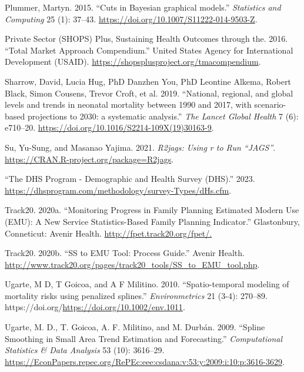 \begin{CSLReferences}{1}{0}
\leavevmode{}%
Plummer, Martyn. 2015. {``{Cuts in Bayesian graphical models}.''} \emph{Statistics and Computing} 25 (1): 37--43. \url{https://doi.org/10.1007/S11222-014-9503-Z}.

\leavevmode{}%
Private Sector (SHOPS) Plus, Sustaining Health Outcomes through the. 2016. {``Total Market Approach Compendium.''} United States Agency for International Development (USAID). \url{https://shopsplusproject.org/tmacompendium}.

\leavevmode{}%
Sharrow, David, Lucia Hug, PhD Danzhen You, PhD Leontine Alkema, Robert Black, Simon Cousens, Trevor Croft, et al. 2019. {``{National, regional, and global levels and trends in neonatal mortality between 1990 and 2017, with scenario-based projections to 2030: a systematic analysis}.''} \emph{The Lancet Global Health} 7 (6): e710--20. \url{https://doi.org/10.1016/S2214-109X(19)30163-9}.

\leavevmode{}%
Su, Yu-Sung, and Masanao Yajima. 2021. \emph{R2jags: Using r to Run {``{JAGS}''}}. \url{https://CRAN.R-project.org/package=R2jags}.

\leavevmode{}%
{``{The DHS Program - Demographic and Health Survey (DHS)}.''} 2023. \url{https://dhsprogram.com/methodology/survey-Types/dHs.cfm}.

\leavevmode{}%
Track20. 2020a. {``{Monitoring Progress in Family Planning Estimated Modern Use (EMU): A New Service Statistics-Based Family Planning Indicator}.''} Glastonbury, Conneticut: Avenir Health. \url{http://fpet.track20.org/fpet/.}

\leavevmode{}%
Track20. 2020b. {``{SS to EMU Tool: Process Guide}.''} Avenir Health. \url{http://www.track20.org/pages/track20_tools/SS_to_EMU_tool.php}.

\leavevmode{}%
Ugarte, M D, T Goicoa, and A F Militino. 2010. {``{Spatio-temporal modeling of mortality risks using penalized splines}.''} \emph{Environmetrics} 21 (3-4): 270--89. https://doi.org/\url{https://doi.org/10.1002/env.1011}.

\leavevmode{}%
Ugarte, M. D., T. Goicoa, A. F. Militino, and M. Durbán. 2009. {``Spline Smoothing in Small Area Trend Estimation and Forecasting.''} \emph{Computational Statistics \& Data Analysis} 53 (10): 3616--29. \url{https://EconPapers.repec.org/RePEc:eee:csdana:v:53:y:2009:i:10:p:3616-3629}.


\end{CSLReferences}
